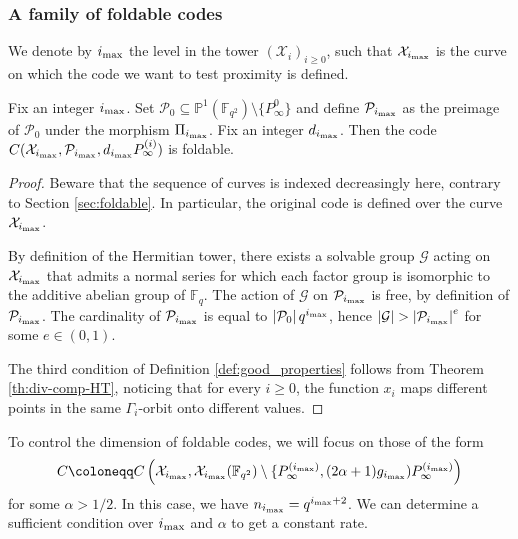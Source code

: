 \documentclass[a4paper,USenglish,autoref]{lipics-v2021}
\newcommand\F{\mathbb{F}}
\newcommand\Fq{\mathbb{F}_q}
\newcommand\PP{\mathbb{P}}
\newcommand{\size}[1]{\left|#1\right|}
\newcommand\calX{\mathcal{X}}
\newcommand\calP{\mathcal{P}}
\newcommand\calG{\mathcal{G}}
\newcommand\mydef{\coloneqq}
\newcommand{\ii}{i_{\rm{max}}}
\begin{document}
\subsubsection{A family of foldable codes}\label{subsec:foldable-towers-codes}

We denote by $\ii$ the level in the tower $(\calX_i)_{i\geq 0}$, such that $\calX_{\ii}$ is the curve on which the code we want to test proximity is defined. 


\begin{proposition}\label{prop:tower-family}
	Fix an integer $\ii$. Set $\calP_{0} \subseteq \PP^1(\F_{q^2})\setminus\{P^{0}_\infty\}$ and define $\calP_{\ii}$ as the preimage of $\calP_0$ under the morphism $\Pi_{\ii}$. Fix an integer $d_{\ii}$. Then the code $C(\calX_{\ii},\calP_{\ii}, d_{\ii}P^{(i)}_{\infty})$ is foldable.
	
	
	
\end{proposition}
\begin{proof}
	Beware that the sequence of curves is indexed decreasingly here, contrary to Section \ref{sec:foldable}. In particular, the original code is defined over the curve $\calX_{\ii}$.
	
	By definition of the Hermitian tower, there exists a solvable group $\calG$ acting on $\calX_{\ii}$ that admits a normal series for which each factor group is isomorphic to the additive abelian group of $\Fq$. The action of $\calG$ on $\calP_{\ii}$ is free, by definition of $\calP_{\ii}$. The cardinality of $\calP_{\ii}$ is equal to $\size{\calP_{0}}q^{\ii}$, hence $\size{\calG} > \size{\calP_{\ii}}^e$ for some $e \in (0,1)$. 
	
	The third condition of Definition \ref{def:good_properties} follows from Theorem \ref{th:div-comp-HT}, noticing that for every $i\geq 0$, the function $x_i$ maps different points in the same $\Gamma_i$-orbit onto different values.
\end{proof}


To control the dimension of foldable codes, we will focus on those of the form
\begin{equation}\label{eq:def_Cimax}
	C \mydef C\left(\calX_{\ii},\calX_{\ii}(\F_{q^2})\setminus \{P^{(\ii)}_{\infty} , (2\alpha+1)g_{\ii})P^{(\ii)}_{\infty}\right)
\end{equation}
for some $\alpha > 1/2$. In this case, we have $n_{\ii}=q^{\ii+2}$. We  can determine a sufficient condition over $\ii$ and $\alpha$ to get a constant rate.
\end{document}
